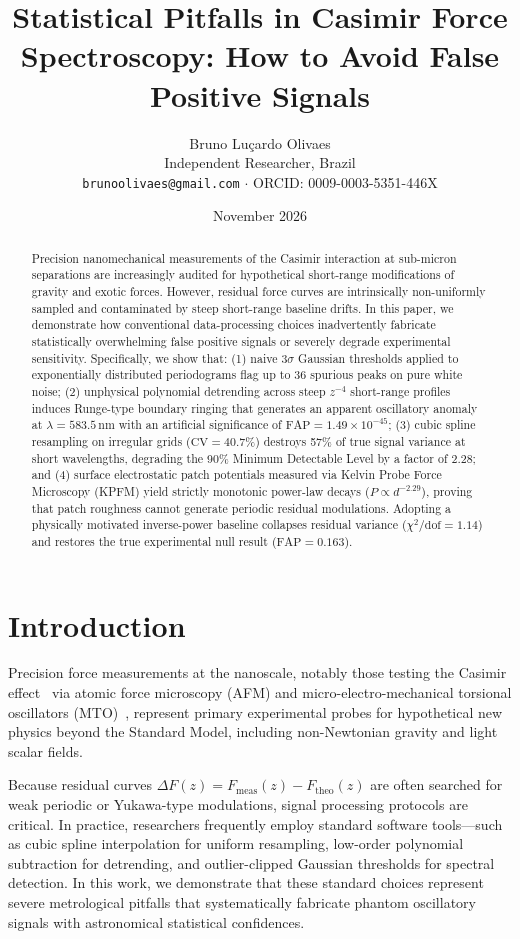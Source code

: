 \documentclass[10pt,twocolumn,a4paper]{article}
\title{\textbf{Statistical Pitfalls in Casimir Force Spectroscopy: How to Avoid False Positive Signals}}
\author{Bruno Lu\c{c}ardo Olivaes \\ \small Independent Researcher, Brazil \\ \small \texttt{brunoolivaes@gmail.com} $\cdot$ ORCID: 0009-0003-5351-446X}
\date{November 2026}
\begin{document}
\maketitle

\begin{abstract}
\noindent Precision nanomechanical measurements of the Casimir interaction at sub-micron separations are increasingly audited for hypothetical short-range modifications of gravity and exotic forces. However, residual force curves are intrinsically non-uniformly sampled and contaminated by steep short-range baseline drifts. In this paper, we demonstrate how conventional data-processing choices inadvertently fabricate statistically overwhelming false positive signals or severely degrade experimental sensitivity. Specifically, we show that: (1) naive $3\sigma$ Gaussian thresholds applied to exponentially distributed periodograms flag up to 36 spurious peaks on pure white noise; (2) unphysical polynomial detrending across steep $z^{-4}$ short-range profiles induces Runge-type boundary ringing that generates an apparent oscillatory anomaly at $\lambda = 583.5\,\mathrm{nm}$ with an artificial significance of $\mathrm{FAP} = 1.49 \times 10^{-45}$; (3) cubic spline resampling on irregular grids ($\mathrm{CV} = 40.7\%$) destroys 57\% of true signal variance at short wavelengths, degrading the 90\% Minimum Detectable Level by a factor of 2.28; and (4) surface electrostatic patch potentials measured via Kelvin Probe Force Microscopy (KPFM) yield strictly monotonic power-law decays ($P \propto d^{-2.29}$), proving that patch roughness cannot generate periodic residual modulations. Adopting a physically motivated inverse-power baseline collapses residual variance ($\chi^2/\mathrm{dof} = 1.14$) and restores the true experimental null result ($\mathrm{FAP} = 0.163$).
\end{abstract}

\section{Introduction}
Precision force measurements at the nanoscale, notably those testing the Casimir effect~\cite{casimir1948,lifshitz1956} via atomic force microscopy (AFM) and micro-electro-mechanical torsional oscillators (MTO)~\cite{decca2003,dejong2025}, represent primary experimental probes for hypothetical new physics beyond the Standard Model, including non-Newtonian gravity and light scalar fields.

Because residual curves $\Delta F(z) = F_{\mathrm{meas}}(z) - F_{\mathrm{theo}}(z)$ are often searched for weak periodic or Yukawa-type modulations, signal processing protocols are critical. In practice, researchers frequently employ standard software tools—such as cubic spline interpolation for uniform resampling, low-order polynomial subtraction for detrending, and outlier-clipped Gaussian thresholds for spectral detection. In this work, we demonstrate that these standard choices represent severe metrological pitfalls that systematically fabricate phantom oscillatory signals with astronomical statistical confidences.
\end{document}
